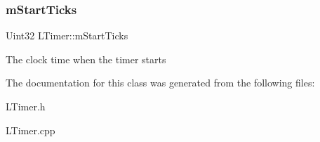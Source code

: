 \subsubsection{\texorpdfstring{m\+Start\+Ticks}{mStartTicks}}
{\footnotesize\ttfamily Uint32 L\+Timer\+::m\+Start\+Ticks\hspace{0.3cm}{\ttfamily [private]}}

The clock time when the timer starts 

The documentation for this class was generated from the following files\+:\begin{DoxyCompactItemize}
\item 
L\+Timer.\+h\item 
L\+Timer.\+cpp\end{DoxyCompactItemize}
